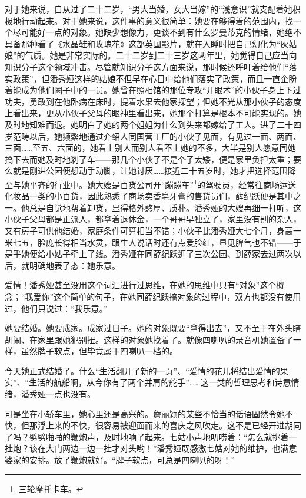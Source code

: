 \par 对于她来说，自从过了二十二岁，“男大当婚，女大当嫁”的“浅意识”就支配着她积极地行动起来。对于她来说，这件事的意义很简单：她要在够得着的范围内，找一个尽可能好一点的对象。她缺少想像力，更谈不到有什么罗曼蒂克的情绪，她绝不具备那种看了《水晶鞋和玫瑰花》这部英国影片，就在入睡时把自己幻化为“灰姑娘”的气质。她是非常实际的。二十二岁到二十三岁这两年里，她觉得自己应当向知识分子这个领域冲击。尽管就知识分子这方面来说，那时候还呼吁着给他们“落实政策”，但潘秀娅这样的姑娘不但早在心目中给他们落实了政策，而且一直企盼着能成为他们圈子中的一员。她曾在照相馆的那位专攻“开眼术”的小伙子身上下过功夫，勇敢到在他卧病在床时，提着水果去他家探望；但她不光从那小伙子的态度上看出来，更从小伙子父母的眼神里看出来，她那个打算是根本不可能实现的。她及时地知难而退。她明白了她的两个姐姐为什么到头来都嫁给了工人。进了二十四岁范畴以后，她频繁地通过介绍人同国营工厂的小伙子见面，有见过一面、两面、三面……至五、六面的，她看上别人而别人看不上她的不多，大半是别人愿意同她搞下去而她及时地刹了车——那几个小伙子不是个子太矮，便是家里负担太重；要么就是刚进公园便想动手动脚，让她讨厌……接近二十五岁时，她才把选择范围降至与她平齐的行业中。她大嫂是百货公司开“蹦蹦车”\footnote{三轮摩托卡车。}的驾驶员，经常往商场运送化妆品一类的小百货，因此熟悉了商场卖香皂牙膏的售货员们，薛纪跃便是其中之一。他总是自觉地帮着卸货，显得格外憨厚、质朴。潘秀娅的大嫂再细一打听，这小伙子父母都是正派人，都拿着退休金，一个哥哥早独立了，家里没有别的杂人，又有房子可供他结婚，家庭条件可算相当不错；小伙子比潘秀娅大七个月，身高一米七五，脸庞长得相当水灵，跟生人说话时还有点爱脸红，显见脾气也不错——于是乎她便给小姑子牵上了线。潘秀娅在同薛纪跃逛了三次公园、到薛家去过两次以后，就明确地表了态：她乐意。
\par 爱情！潘秀娅甚至没用这个词汇进行过思维，在她的思维中只有“对象”这个概念；“我爱你”这个简单的句子，在她同薛纪跃搞对象的过程中，双方也都没有使用过，他们只说过：“我乐意。”
\par 她要结婚。她要成家。成家过日子。她的对象既要“拿得出去”，又不至于在外头瞎胡闹、在家里跟她犯别扭。这样的对象她找着了。就像四喇叭的录音机她置备了一样，虽然牌子软点，但毕竟属于四喇叭一档的。
\par 今天她正式结婚了。什么“生活翻开了新的一页”、“爱情的花儿将结出爱情的果实”、“生活的航船啊，从今你有了两个并肩的舵手”……这一类的哲理思考和诗意情绪，潘秀娅一点也没有。
\par 可是坐在小轿车里，她心里还是高兴的。詹丽颖的某些不恰当的话语固然令她不快，但那浮上来的不快，很容易被迎面而来的喜庆之风吹走。这不是已经开进胡同了吗？劈劈啪啪的鞭炮声，及时地响了起来。七姑小声地叨唠着：“怎么就挑着一挂炮？该在大门两边一边一挂才对头哟！”潘秀娅既感激七姑对她的维护，也满意婆家的安排。放了鞭炮就好。“牌子软点，可总是四喇叭的呀！”







